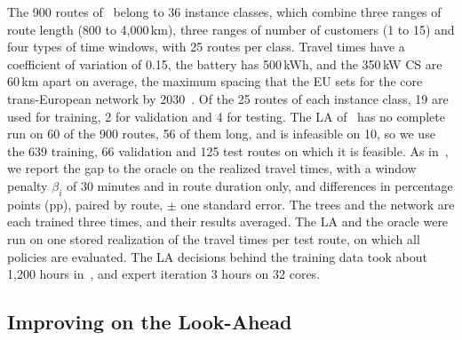 \documentclass[runningheads]{llncs}
\begin{document}
The 900 routes of~\cite{pagnier2026scheduling} belong to 36 instance classes,
which combine three ranges of route length (800 to 4{,}000\,km), three ranges
of number of customers (1 to 15) and four types of time windows, with 25 routes
per class. Travel times have a coefficient of variation of 0.15, the battery
has 500\,kWh, and the 350\,kW CS are 60\,km apart on average, the maximum
spacing that the EU sets for the core trans-European network by
2030~\cite{afir}. Of
the 25 routes of each instance class, 19 are used for training, 2 for
validation and 4 for testing. The LA of~\cite{pagnier2026scheduling} has no
complete run on 60 of the 900 routes, 56 of them long, and is infeasible on
10, so we use the 639 training, 66 validation and 125 test routes on which it
is feasible. As in~\cite{pagnier2026scheduling}, we report the gap to the
oracle on the realized travel times, with a window penalty $\beta_i$ of 30
minutes and in route duration only, and differences in percentage points (pp),
paired by route, $\pm$ one standard error. The trees
and the network are each trained three times, and their results averaged. The
LA and the oracle were run on one stored realization of the travel times per
test route, on which all policies are evaluated. The LA
decisions behind the training data took about 1{,}200 hours
in~\cite{pagnier2026scheduling}, and expert iteration 3 hours on 32 cores.

\subsection{Improving on the Look-Ahead}
\label{sec:base}
\end{document}
